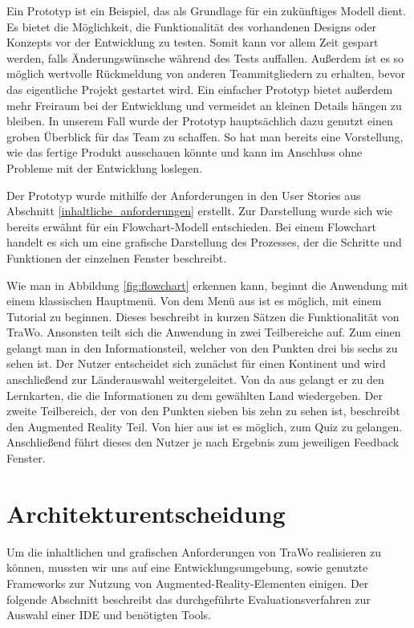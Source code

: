 Ein Prototyp ist ein Beispiel, das als Grundlage für ein zukünftiges Modell dient. Es bietet die Möglichkeit, die Funktionalität des vorhandenen Designs oder Konzepts vor der Entwicklung zu testen. Somit kann vor allem Zeit gespart werden, falls Änderungswünsche während des Tests auffallen. Außerdem ist es so möglich wertvolle Rückmeldung von anderen Teammitgliedern zu erhalten, bevor das eigentliche Projekt gestartet wird. Ein einfacher Prototyp bietet außerdem mehr Freiraum bei der Entwicklung und vermeidet an kleinen Details hängen zu bleiben. In unserem Fall wurde der Prototyp hauptsächlich dazu genutzt einen groben Überblick für das Team zu schaffen. So hat man bereits eine Vorstellung, wie das fertige Produkt ausschauen könnte und kann im Anschluss ohne Probleme mit der Entwicklung loslegen.

Der Prototyp wurde mithilfe der Anforderungen in den User Stories aus Abschnitt \ref{inhaltliche_anforderungen} erstellt. Zur Darstellung wurde sich wie bereits erwähnt für ein Flowchart-Modell entschieden. Bei einem Flowchart handelt es sich um eine grafische Darstellung des Prozesses, der die Schritte und Funktionen der einzelnen Fenster beschreibt.

Wie man in Abbildung \ref{fig:flowchart} erkennen kann, beginnt die Anwendung mit einem klassischen Hauptmenü. Von dem Menü aus ist es möglich, mit einem Tutorial zu beginnen. Dieses beschreibt in kurzen Sätzen die Funktionalität von TraWo. Ansonsten teilt sich die Anwendung in zwei Teilbereiche auf. Zum einen gelangt man in den Informationsteil, welcher von den Punkten drei bis sechs zu sehen ist. Der Nutzer entscheidet sich zunächst für einen Kontinent und wird anschließend zur Länderauswahl weitergeleitet. Von da aus gelangt er zu den Lernkarten, die die Informationen zu dem gewählten Land wiedergeben. Der zweite Teilbereich, der von den Punkten sieben bis zehn zu sehen ist, beschreibt den Augmented Reality Teil. Von hier aus ist es möglich, zum Quiz zu gelangen. Anschließend führt dieses den Nutzer je nach Ergebnis zum jeweiligen Feedback Fenster.

\section{Architekturentscheidung} \label{architekturentscheidung}
Um die inhaltlichen und grafischen Anforderungen von TraWo realisieren zu können, mussten wir uns auf eine Entwicklungsumgebung, sowie genutzte Frameworks zur Nutzung von Augmented-Reality-Elementen einigen. Der folgende Abschnitt beschreibt das durchgeführte Evaluationsverfahren zur Auswahl einer IDE und benötigten Tools.
